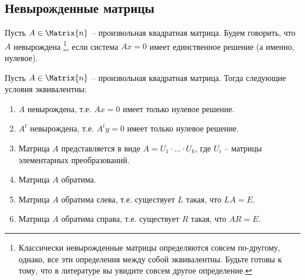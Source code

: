 \subsection{Невырожденные матрицы}


Пусть $A\in\Matrix{n}$ -- произвольная квадратная матрица.
Будем говорить, что $A$ невырождена%
\footnote{Классически невырожденные матрицы определяются совсем по-другому, однако, все эти определения между собой эквивалентны.
Будьте готовы к тому, что в литературе вы увидите совсем другое определение.},
если система $Ax = 0$ имеет единственное решение (а именно, нулевое). 

\begin{claim}\label{claim::InvertibleDiscription}
Пусть $A\in\Matrix{n}$ -- произвольная квадратная матрица.
Тогда следующие условия эквивалентны:
\begin{enumerate}
\item $A$ невырождена, т.е. $Ax = 0$ имеет только нулевое решение.
\item $A^t$ невырождена, т.е. $A^ty = 0$ имеет только нулевое решение.
\item Матрица $A$ представляется в виде $A = U_1\cdot \ldots \cdot U_k$, где $U_i$ -- матрицы элементарных преобразований.
\item Матрица $A$ обратима.
\item Матрица $A$ обратима слева, т.е. существует $L$ такая, что $LA = E$.
\item Матрица $A$ обратима справа, т.е. существует $R$ такая, что $AR = E$.
\end{enumerate}
\end{claim}
